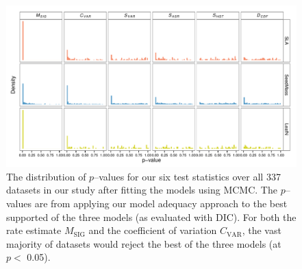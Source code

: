 \documentclass[a4paper,11pt]{article}
\begin{document}
{\begin{figure}[p]
  \centering
  \includegraphics[angle=90, origin=c, scale=0.85]{figs/pval-hist-bayes}
  \caption{The distribution of $p$--values for our six test statistics over all 337 datasets in our study after fitting the models using MCMC. The $p$--values are from applying our model adequacy approach to the best supported of the three models (as evaluated with DIC). For both the rate estimate $M_{\text{SIG}}$ and the coefficient of variation $C_{\text{VAR}}$, the vast majority of datasets would reject the best of the three models (at $p<$ 0.05).}
  \label{fig:supp-pvalues}
\end{figure}

}
\end{document}
